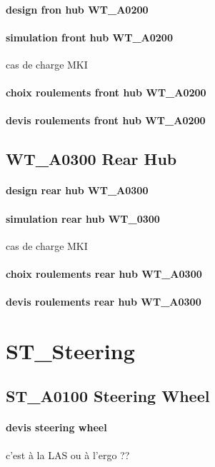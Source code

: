 		\paragraph{design fron hub WT\_A0200} 
		\paragraph{simulation front hub WT\_A0200} cas de charge MKI

		\paragraph{choix roulements front hub WT\_A0200} 
		\paragraph{devis roulements front hub WT\_A0200} 
	\subsection*{WT\_A0300 Rear Hub} 
 \par 
		\paragraph{design rear hub WT\_A0300} 
		\paragraph{simulation rear hub WT\_0300} cas de charge MKI
		\paragraph{choix roulements rear hub WT\_A0300} 
		\paragraph{devis roulements rear hub WT\_A0300} 
\newpage 
 \section*{ST\_Steering} 
 \par 
	\subsection*{ST\_A0100 Steering Wheel} 
 \par 
		\paragraph{devis steering wheel} c'est à la LAS ou à l'ergo ??
